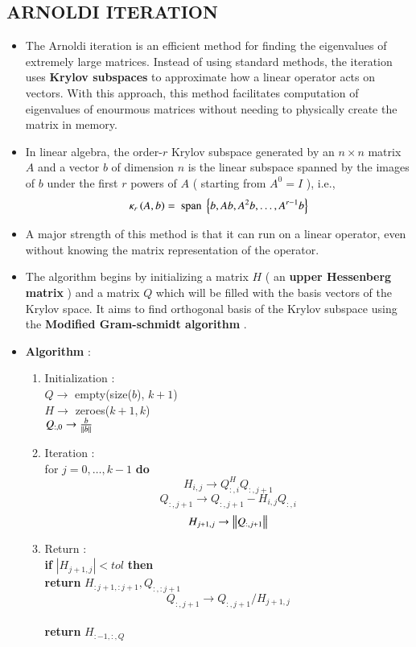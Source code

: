 \documentclass[report,12pt,onecolumn]{IEEEtran}
\theoremstyle{remark}
\begin{document}
\begin{itemize}
		\section{ARNOLDI ITERATION} 
		\begin{itemize}
			\item The Arnoldi iteration is an efficient method for finding the eigenvalues of extremely large matrices. Instead of using standard methods, the iteration uses \textbf{Krylov subspaces} to approximate how a linear operator acts on vectors. With this approach, this method facilitates computation of eigenvalues of enourmous matrices without needing to physically create the matrix in memory.
			\item In linear algebra, the order-$r$ Krylov subspace generated by an $n \times n$ matrix $A$ and a vector $b$ of dimension $n$ is the linear subspace spanned by the images of $b$ under the first $r$ powers of $A$ ( starting from $A^0 = I$ ), i.e.,
				$$ \kappa_{r} \left(A,b\right) = \text{ span } \left\{b, Ab, A^2b, \dots, A^{r-1}b\right\} $$
			\item A major strength of this method is that it can run on a linear operator, even without knowing the matrix representation of the operator.
			\item The algorithm begins by initializing a matrix $H$ ( an \textbf{upper Hessenberg matrix} ) and a matrix $Q$ which will be filled with the basis vectors of the Krylov space. It aims to find orthogonal basis of the Krylov subspace using the \textbf{Modified Gram-schmidt algorithm} .
			\item \textbf{Algorithm} : \\
				\begin{enumerate}
					\item Initialization : \\
						$Q \to$ empty(size($b$), $k+1$) \\
						$H \to$ zeroes($k+1, k$) \\
						$Q_{:,0} \to \frac{b}{\left\lVert b\right\rVert} $
					\item Iteration : \\
						for $j=0, \dots, k-1$ \textbf{do} \\
						$$ H_{i,j} \to Q_{:,i}^{H} Q_{:,j+1} $$
						$$ Q_{:,j+1} \to Q_{:,j+1} - H_{i,j} Q_{:,i} $$
						$$ H_{j+1, j} \to \left\lVert Q_{:,j+1}\right\rVert $$
					\item Return : \\
						\textbf{if} $|H_{j+1,j}| < tol$ \textbf{then} \\
						\textbf{return} $H_{:j+1, :j+1}, Q_{:, :j+1} $ \\
						$$ Q_{:,j+1} \to Q_{:,j+1} / H_{j+1,j} $$ \\
						\textbf{return} $H_{:-1,:,Q}$


\end{enumerate}
\end{itemize}
\end{itemize}
\end{document}
